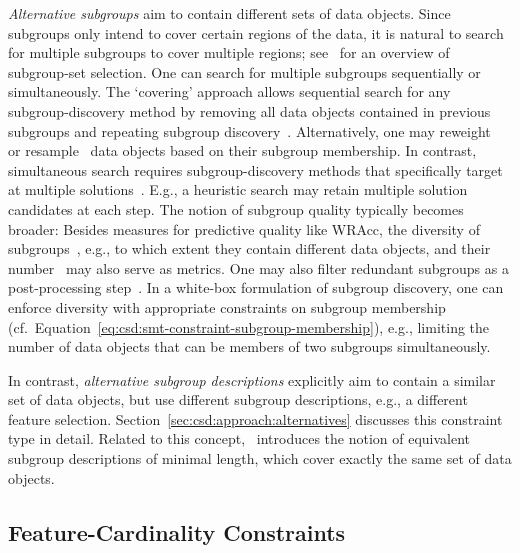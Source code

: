 \documentclass{article}
\theoremstyle{definition}
\begin{document}
\emph{Alternative subgroups} aim to contain different sets of data objects.
Since subgroups only intend to cover certain regions of the data, it is natural to search for multiple subgroups to cover multiple regions; see~\cite{atzmueller2015subgroup} for an overview of subgroup-set selection.
One can search for multiple subgroups sequentially or simultaneously.
The `covering' approach allows sequential search for any subgroup-discovery method by removing all data objects contained in previous subgroups and repeating subgroup discovery~\cite{friedman1999bump}.
Alternatively, one may reweight~\cite{gamberger2002expert, lavrac2004subgroup} or resample~\cite{scholz2005sampling} data objects based on their subgroup membership.
In contrast, simultaneous search requires subgroup-discovery methods that specifically target at multiple solutions~\cite{leeuwen2012diverse, leeuwen2013discovering, lemmerich2010fast, lucas2018ssdp+, proencca2022robust}.
E.g., a heuristic search may retain multiple solution candidates at each step.
The notion of subgroup quality typically becomes broader:
Besides measures for predictive quality like WRAcc, the diversity of subgroups~\cite{belfodil2019fssd, leeuwen2012diverse, leeuwen2013discovering, lucas2018ssdp+}, e.g., to which extent they contain different data objects, and their number~\cite{helal2016subgroup, herrera2011overview, ventura2018subgroup} may also serve as metrics.
One may also filter redundant subgroups as a post-processing step~\cite{bosc2018anytime, grosskreutz2012enhanced, hudson2023subgroup, leeuwen2013discovering}.
In a white-box formulation of subgroup discovery, one can enforce diversity with appropriate constraints on subgroup membership (cf.~Equation~\ref{eq:csd:smt-constraint-subgroup-membership}), e.g., limiting the number of data objects that can be members of two subgroups simultaneously.

In contrast, \emph{alternative subgroup descriptions} explicitly aim to contain a similar set of data objects, but use different subgroup descriptions, e.g., a different feature selection.
Section~\ref{sec:csd:approach:alternatives} discusses this constraint type in detail.
Related to this concept, \cite{boley2009non}~introduces the notion of equivalent subgroup descriptions of minimal length, which cover exactly the same set of data objects.

\subsection{Feature-Cardinality Constraints}
\label{sec:csd:approach:cardinality}
\end{document}
